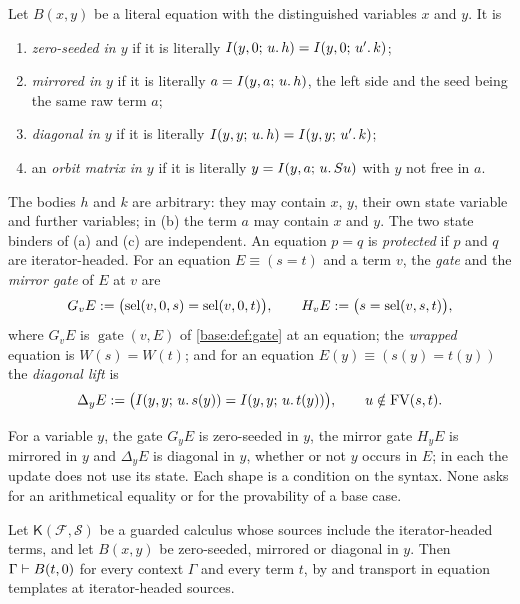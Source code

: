 \begin{definition}
\label{guard:def:shapes}
Let $B(x,y)$ be a literal equation with the distinguished variables $x$ and
$y$.  It is
\begin{enumerate}[label=\textup{(\alph*)}]
\item \emph{zero-seeded in $y$} if it is literally
 $I(y,0;\,u.\,h)=I(y,0;\,u'.\,k)$;
\item \emph{mirrored in $y$} if it is literally $a=I(y,a;\,u.\,h)$, the
 left side and the seed being the same raw term $a$;
\item \emph{diagonal in $y$} if it is literally
 $I(y,y;\,u.\,h)=I(y,y;\,u'.\,k)$;
\item an \emph{orbit matrix in $y$} if it is literally
 $y=I(y,a;\,u.\,S u)$ with $y$ not free in $a$.
\end{enumerate}
The bodies $h$ and $k$ are arbitrary: they may contain $x$, $y$, their own
state variable and further variables; in (b) the term $a$ may contain $x$
and $y$.  The two state binders of (a) and (c) are independent.  An equation
$p=q$ is \emph{protected} if $p$ and $q$ are iterator-headed.  For an
equation $E\equiv(s=t)$ and a term $v$, the \emph{gate} and the \emph{mirror
gate} of $E$ at $v$ are
\[
 G_vE\mathrel{:=}\bigl(\operatorname{sel}(v,0,s)=\operatorname{sel}(v,0,t)\bigr),
 \qquad
 H_vE\mathrel{:=}\bigl(s=\operatorname{sel}(v,s,t)\bigr),
\]
where $G_vE$ is $\operatorname{gate}(v,E)$ of \cref{base:def:gate} at an
equation; the \emph{wrapped} equation is $W(s)=W(t)$; and for an equation
$E(y)\equiv(s(y)=t(y))$ the \emph{diagonal lift} is
\[
 \Delta_yE\mathrel{:=}\bigl(I(y,y;\,u.\,s(y))=I(y,y;\,u.\,t(y))\bigr),
 \qquad u\notin\operatorname{FV}(s,t).
\]
\end{definition}

For a variable $y$, the gate $G_yE$ is zero-seeded in $y$, the mirror gate
$H_yE$ is mirrored in $y$ and $\Delta_yE$ is diagonal in $y$, whether or not
$y$ occurs in $E$; in each the update does not use its state.  Each shape is
a condition on the syntax.  None asks for an arithmetical equality or for
the provability of a base case.

\begin{lemma}
\label{guard:lem:zero}
Let $\mathsf K(\mathcal F,\mathcal S)$ be a guarded calculus whose sources
include the iterator-headed terms, and let $B(x,y)$ be zero-seeded,
mirrored or diagonal in $y$.  Then $\Gamma\vdash B(t,0)$ for every context
$\Gamma$ and every term $t$, by  and transport in equation
templates at iterator-headed sources.
\end{lemma}

